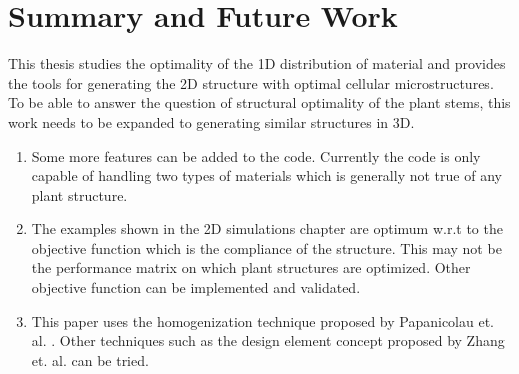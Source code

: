 \documentclass[openright,twoside]{iitkthesis}
\begin{document}
\chapter{Summary and Future Work}
This thesis studies the optimality of the 1D distribution of material and provides the tools for generating the 2D structure with optimal cellular microstructures. To be able to answer the question of structural optimality of the plant stems, this work needs to be expanded to generating similar structures in 3D.  
\begin{enumerate}
\item Some more features can be added to the code. Currently the code is only capable of handling two types of materials which is generally not true of any plant structure. 
\item The examples shown in the 2D simulations chapter are optimum w.r.t to the objective function which is the compliance of the structure. This may not be the performance matrix on which plant structures are optimized. Other objective function can be implemented and validated.
\item This paper uses the homogenization technique proposed by Papanicolau et. al. \cite{papanicolau1978asymptotic}. Other techniques such as the design element concept proposed by Zhang et. al. \cite{zhang2006scale} can be tried.

\end{enumerate}
\begin{singlespace}


\end{singlespace}
\end{document}
